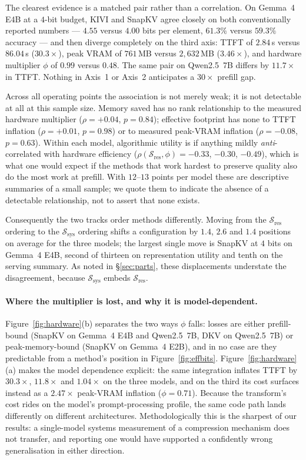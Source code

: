 \documentclass[sigplan,10pt,anonymous,review,nonacm]{acmart}
\newcommand{\Sres}{\mathcal{S}_{\text{res}}}
\newcommand{\Ssys}{\mathcal{S}_{\text{sys}}}
\begin{document}
The clearest evidence is a matched pair rather than a correlation. On Gemma~4
E4B at a $4$-bit budget, KIVI and SnapKV agree closely on both conventionally
reported numbers --- $4.55$ versus $4.00$ bits per element, $61.3\%$ versus
$59.3\%$ accuracy --- and then diverge completely on the third axis: TTFT of
$2.84$\,s versus $86.04$\,s ($30.3\times$), peak VRAM of $761$\,MB versus
$2{,}632$\,MB ($3.46\times$), and hardware multiplier $\phi$ of $0.99$ versus
$0.48$. The same pair on Qwen2.5~7B differs by $11.7\times$ in TTFT. Nothing
in Axis~1 or Axis~2 anticipates a $30\times$ prefill gap.

Across all operating points the association is not merely weak; it is not
detectable at all at this sample size.
Memory saved has no rank relationship to the measured hardware multiplier
($\rho = {+}0.04$, $p = 0.84$); effective footprint has none to TTFT inflation
($\rho = {+}0.01$, $p = 0.98$) or to measured peak-VRAM inflation
($\rho = {-}0.08$, $p = 0.63$). Within each model, algorithmic utility is if
anything mildly \emph{anti}-correlated with hardware efficiency
($\rho(\Sres, \phi) = {-}0.33$, ${-}0.30$, ${-}0.49$), which is what one would
expect if the methods that work hardest to preserve quality also do the most
work at prefill. With $12$--$13$ points per model these are descriptive
summaries of a small sample; we quote them to indicate the absence of a
detectable relationship, not to assert that none exists.

Consequently the two tracks order methods differently. Moving from the $\Sres$
ordering to the $\Ssys$ ordering shifts a configuration by $1.4$, $2.6$ and
$1.4$ positions on average for the three models; the largest single move is
SnapKV at $4$ bits on Gemma~4 E4B, second of thirteen on representation
utility and tenth on the serving summary. As noted in \S\ref{sec:parts}, these
displacements understate the disagreement, because $\Ssys$ embeds $\Sres$.

\paragraph{Where the multiplier is lost, and why it is model-dependent.}
Figure~\ref{fig:hardware}(b) separates the two ways $\phi$ falls: losses are
either prefill-bound (SnapKV on Gemma~4 E4B and Qwen2.5~7B, DKV on
Qwen2.5~7B) or peak-memory-bound (SnapKV on Gemma~4 E2B), and in no case are
they predictable from a method's position in Figure~\ref{fig:effbits}.
Figure~\ref{fig:hardware}(a) makes the model dependence explicit: the same
integration inflates TTFT by $30.3\times$, $11.8\times$ and $1.04\times$ on
the three models, and on the third its cost surfaces instead as a
$2.47\times$ peak-VRAM inflation ($\phi = 0.71$). Because the transform's cost
rides on the model's prompt-processing profile, the same code path lands
differently on different architectures. Methodologically this is the sharpest
of our results: a single-model systems measurement of a compression mechanism
does not transfer, and reporting one would have supported a confidently wrong
generalisation in either direction.
\end{document}
